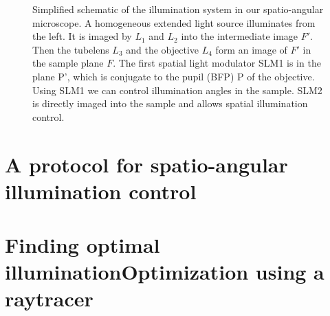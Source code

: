 \begin{figure}[!hbt]
  \centering
  \caption{Simplified schematic of the illumination system in our
    spatio-angular microscope. A homogeneous extended light source
    illuminates from the left. It is imaged by $L_1$ and $L_2$ into
    the intermediate image $F'$. Then the tubelens $L_3$ and the
    objective $L_4$ form an image of $F'$ in the sample plane $F$. The
    first spatial light modulator SLM1 is in the plane P', which is
    conjugate to the pupil (BFP) P of the objective. Using SLM1 we can
    control illumination angles in the sample. SLM2 is directly imaged
    into the sample and allows spatial illumination
    control.} 
  \label{fig:memi-simple}
\end{figure}
\section{A protocol for spatio-angular illumination control}
\section{Finding optimal illuminationOptimization using a raytracer}
